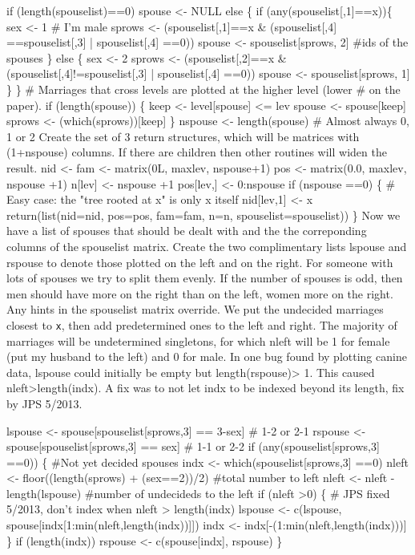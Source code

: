 \documentclass{article}
\begin{document}
\begin{enumerate}
    if (length(spouselist)==0)  spouse <- NULL
    else \{
        if (any(spouselist[,1]==x))\{
            sex <- 1                              # I'm male
            sprows <- (spouselist[,1]==x & (spouselist[,4] ==spouselist[,3] |
                                            spouselist[,4] ==0))
            spouse <- spouselist[sprows, 2] #ids of the spouses
            \}
        else \{
            sex <- 2
            sprows <- (spouselist[,2]==x & (spouselist[,4]!=spouselist[,3] |
                                            spouselist[,4] ==0))
            spouse <- spouselist[sprows, 1]
            \}
        \}
    # Marriages that cross levels are plotted at the higher level (lower
    #  on the paper).
    if (length(spouse)) \{
        keep <- level[spouse] <= lev
        spouse <- spouse[keep]
        sprows <- (which(sprows))[keep]
        \}
    nspouse <- length(spouse)  # Almost always 0, 1 or 2
\nwendcode{}\nwdocspar
Create the set of 3 return structures, which will be matrices with
(1+nspouse) columns.
If there are children then other routines will widen the result.
\nwenddocs{}\plusendmoddef
    nid <- fam <- matrix(0L, maxlev, nspouse+1)
    pos <- matrix(0.0, maxlev, nspouse +1)
    n[lev] <- nspouse +1       
    pos[lev,] <- 0:nspouse
    if (nspouse ==0) \{   
        # Easy case: the "tree rooted at x" is only x itself
        nid[lev,1] <- x
        return(list(nid=nid, pos=pos, fam=fam, n=n, spouselist=spouselist))
        \}
\nwendcode{}\nwdocspar
Now we have a list of spouses that should be dealt with and 
the the correponding columns of the spouselist matrix.  
Create the two complimentary lists lspouse and rspouse to denote
those plotted on the left and on the right.  
For someone with lots of spouses we try to split them evenly.
If the number of spouses is odd, then men should have more on the
right than on the left, women more on the right.
Any hints in the spouselist matrix override.
We put the undecided marriages closest to {\tt{}x}, 
then add predetermined ones to the left and
right.
The majority of marriages will be undetermined singletons, for which
nleft will be 1 for female (put my husband to the left) and 0 for male.
In one bug found by plotting canine data, lspouse could initially be empty but 
length(rspouse)> 1. This caused nleft>length(indx). A fix was to not let
indx to be indexed beyond its length, fix by JPS 5/2013.

\nwenddocs{}\plusendmoddef
    lspouse <- spouse[spouselist[sprows,3] == 3-sex] # 1-2 or 2-1
    rspouse <- spouse[spouselist[sprows,3] == sex]   # 1-1 or 2-2
    if (any(spouselist[sprows,3] ==0)) \{
        #Not yet decided spouses
        indx <- which(spouselist[sprows,3] ==0)
        nleft <- floor((length(sprows) + (sex==2))/2) #total number to left
        nleft <- nleft - length(lspouse)  #number of undecideds to the left
        if (nleft >0) \{
            # JPS fixed 5/2013, don't index when nleft > length(indx)
            lspouse <- c(lspouse, spouse[indx[1:min(nleft,length(indx))]])
            indx <- indx[-(1:min(nleft,length(indx)))]
          \}
        if (length(indx)) rspouse <- c(spouse[indx], rspouse)
      \}


\end{enumerate}
\end{document}
